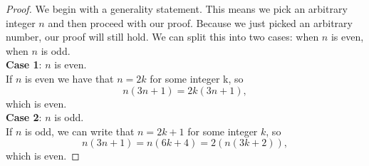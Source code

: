 \begin{proof}
We begin with a generality statement. This means we pick an arbitrary integer $n$ and then proceed with our proof. Because we just picked an arbitrary number, our proof will still hold. We can split this into two cases: when $n$ is even, when $n$ is odd.\\

\textbf{Case 1}: $n$ is even.\\

If $n$ is even we have that $n = 2k$ for some integer k, so 
\[
n(3n +1) = 2k(3n + 1),
\]
which is even.\\

\textbf{Case 2}: $n$ is odd.\\

If $n$ is odd, we can write that $n = 2k+1$ for some integer $k$, so 
\[
n(3n+1) = n(6k+4) = 2(n(3k+2)),
\]
which is even.
\end{proof}

